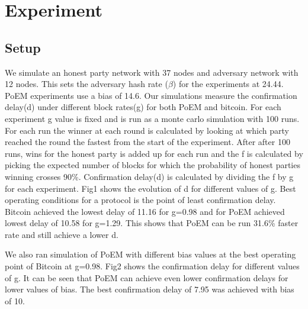 \section{Experiment}

\subsection{Setup}
We simulate an honest party network with 37 nodes and adversary network with 12
nodes. This sets the adversary hash rate ($\beta$) for the experiments at 24.44.
PoEM experiments use a bias of 14.6. Our simulations measure the confirmation
delay(d) under different block rates(g) for both PoEM and bitcoin. For each
experiment g value is fixed and is run as a monte carlo simulation with 100
runs. For each run the winner at each round is calculated by looking at which
party reached the round the fastest from the start of the experiment. After
after 100 runs, wins for the honest party is added up for each run and the f is
calculated by picking the expected number of blocks for which the probability of
honest parties winning crosses 90\%. Confirmation delay(d) is calculated by
dividing the f by g for each experiment. Fig1 shows the evolution of d for
different values of g. Best operating conditions for a protocol is the point of
least confirmation delay. Bitcoin achieved the lowest delay of 11.16 for g=0.98
and for PoEM achieved lowest delay of 10.58 for g=1.29. This shows that PoEM can
be run 31.6\% faster rate and still achieve a lower d.

We also ran simulation of PoEM with different bias values at the best operating
point of Bitcoin at g=0.98. Fig2 shows the confirmation delay for different
values of g. It can be seen that PoEM can achieve even lower confirmation delays
for lower values of bias. The best confirmation delay of 7.95 was achieved with
bias of 10.

